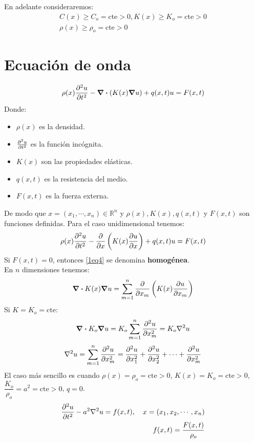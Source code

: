 \documentclass[../main]{subfiles}
\begin{document}
En adelante consideraremos:
\begin{align}
    C(x) \geq C_o=\text{cte} >0, K(x) \geq K_o=\text{cte}>0 \nonumber\\
    \rho(x) \geq \rho_o =\text{cte} >0
\end{align}
\section*{Ecuación de onda}
\begin{equation}
    \rho(x) \pdv{^2 u}{t^2}-\div{\left( K(x) \grad{u}\right)}+q(x,t) u=F(x,t)
    \label{1eq4}
\end{equation}
Donde:
\begin{itemize}
    \item $\rho(x)$ es la densidad.
    \item $\pdv{^2 u}{t^2}$ es la función incógnita.
    \item $K(x)$ son las propiedades elásticas.
    \item $q(x,t)$ es la resistencia del medio.
    \item $F(x,t)$ es la fuerza externa.
\end{itemize}
De modo que
$x=(x_1,\cdots, x_n) \in \mathbb{R}^n$ y $\rho(x), K(x), q(x,t)$ y $F(x,t)$ son funciones definidas.
Para el caso unidimensional tenemos:
\begin{equation}
    \rho(x) \pdv{^2 u}{t^2}-\pdv{}{x} \left( K(x) \pdv{u}{x} \right) + q(x,t) u=F(x,t)
\end{equation}
Si $F(x,t)=0$, entonces \eqref{1eq4} se denomina \textbf{homogénea}. \\
En $n$ dimensiones tenemos:
\begin{equation}
    \div{K(x) \grad{u}}=\sum_{m=1}^n \pdv{}{x_m} \left( K(x) \pdv{u}{x_m} \right)
\end{equation}
Si $K=K_o=\text{cte}$:
\begin{equation}
    \div{K_o \grad{u}}=K_o \sum_{m=1}^n \pdv{^2 u}{x^2_m}=K_o \nabla^2{u}
\end{equation}
\begin{equation*}
    \nabla^2{u}=\sum_{m=1}^n \pdv{^2 u}{x^2_m}=\pdv{^2 u}{x^2_1}+\pdv{^2 u}{x^2_2} + \cdots +\pdv{^2 u}{x^2_m}
\end{equation*}
El caso más sencillo es cuando $\rho(x)=\rho_o=\text{cte}>0$, $K(x)=K_o=\text{cte}>0$, $\dfrac{K_o}{\rho_o}=a^2=\text{cte}>0$, $q=0$.
\begin{align}
    \pdv{^2 u}{t^2}-a^2 \nabla^2{u}=f(x,t) , \quad x=(x_1,x_2,\cdots,x_n) \\
    f(x,t)=\dfrac{F(x,t)}{\rho_o}
\end{align}
\end{document}
